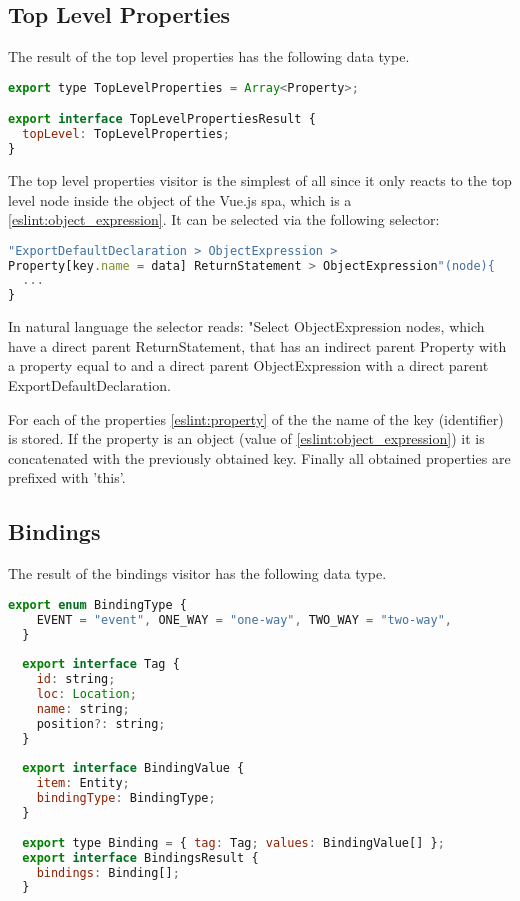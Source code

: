\subsection{Top Level Properties}
The result of the top level properties has the following data type.
\begin{lstlisting}[language=JavaScript]
export type TopLevelProperties = Array<Property>;

export interface TopLevelPropertiesResult {
  topLevel: TopLevelProperties;
}
\end{lstlisting}

The top level properties visitor is the simplest of all since it only reacts to the top level  node inside the  object  of the Vue.js \gls{spa}, which is a  \ref{eslint:object_expression}. It can be selected via the following selector:

\label{impl:top_level_select}
\begin{lstlisting}[language=JavaScript]
"ExportDefaultDeclaration > ObjectExpression > 
Property[key.name = data] ReturnStatement > ObjectExpression"(node){
  ...
}
\end{lstlisting}
In natural language the selector reads: "Select ObjectExpression nodes, which have a direct parent ReturnStatement, that has an indirect parent Property with a property  equal to  and a direct parent ObjectExpression with a direct parent ExportDefaultDeclaration.

For each of the properties \ref{eslint:property} of the  the name of the key (identifier) is stored. If the property is an object (value of  \ref{eslint:object_expression}) it is concatenated with the previously obtained key. Finally all obtained properties are prefixed with 'this'.

\subsection{Bindings}
The result of the bindings visitor has the following data type.
\begin{lstlisting}[language=JavaScript]
  export enum BindingType {
    EVENT = "event", ONE_WAY = "one-way", TWO_WAY = "two-way",
  }
  
  export interface Tag {
    id: string;
    loc: Location;
    name: string;
    position?: string;
  }
  
  export interface BindingValue {
    item: Entity;
    bindingType: BindingType;
  }
  
  export type Binding = { tag: Tag; values: BindingValue[] };
  export interface BindingsResult {
    bindings: Binding[];
  }
\end{lstlisting}


